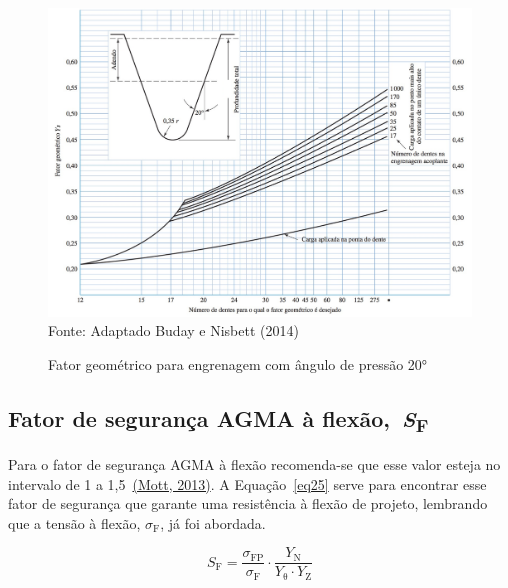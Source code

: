 \documentclass[12pt,a4paper]{article}
\begin{document}
\begin{figure}[!htb]
    \centering
    \caption{Fator geométrico para engrenagem com ângulo de pressão 20°}
    \includegraphics[scale=0.99]{Imagens/Img25.png}\\
    {\footnotesize Fonte: Adaptado Buday e Nisbett (2014)}
    \label{fig:25}
\end{figure}

\subsection*{\texorpdfstring{Fator de segurança AGMA à
flexão,~\emph{S}\textsubscript{F}}{Fator de segurança AGMA à flexão,~SF}}

{\label{fator-de-seguranuxe7a-agma-uxe0-flexuxe3o-sf}}

Para o fator de segurança AGMA à flexão recomenda-se que esse valor
esteja no intervalo de 1 a 1,5~\hyperref[csl:21]{(Mott, 2013)}. A
Equação~{\ref{eq25}} serve para encontrar esse fator de
segurança que garante uma resistência à flexão de projeto, lembrando que
a tensão à flexão, $\sigma_{\text{F}}$, já foi abordada.

\par\null

\begin{equation}
\label{eq25}
S_{\mathrm{F}}\mathrm{=}\frac{{\sigma }_{\mathrm{FP}}}{{\sigma }_{\mathrm{F}}}\cdot \frac{Y_{\mathrm{N}}}{Y_{\mathrm{\theta }}\cdot Y_{\mathrm{Z}}}
\end{equation}

\par\null
\end{document}
